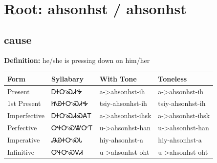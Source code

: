 \documentclass{article}%
\begin{document}
%
\normalsize%
\section*{Root: ahsonhst / ahsonhst}%
\subsection*{cause}%
\textbf{Definition: }%
he/she is pressing down on him/her%
\\[0.5em]%
\begin{tabular}{|l|l|l|l|}%
\hline%
\textbf{Form}&\textbf{Syllabary}&\textbf{With Tone}&\textbf{Toneless}\\%
\hline%
Present&ᎠᏐᏅᏍᏗᎭ&a{-}>ahsonhst{-}ih&a{-}>ahsonhst{-}ih\\%
1st Present&ᏥᏯᏐᏅᏍᏗᎭ&tsiy{-}ahsonhst{-}ih&tsiy{-}ahsonhst{-}ih\\%
Imperfective&ᎠᏐᏅᏍᏗᏍᎪᎢ&a{-}>ahsonhst{-}ihsk&a{-}>ahsonhst{-}ihsk\\%
Perfective&ᎤᏐᏅᏍᏔᏅᎢ&u{-}>ahsonhst{-}han&u{-}>ahsonhst{-}han\\%
Imperative&ᎯᏯᏐᏅᏍᏓ&hiy{-}ahsonhst{-}a&hiy{-}ahsonhst{-}a\\%
Infinitive&ᎤᏐᏅᏍᏙᏗ&u{-}>ahsonhst{-}oht&u{-}>ahsonhst{-}oht\\%
\hline%
\end{tabular}%
\\[1em]%
\end{document}
